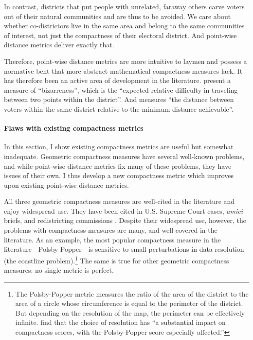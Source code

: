 \documentclass[]{article}
\let\oldparagraph\paragraph
\renewcommand{\paragraph}[1]{\oldparagraph{#1}\mbox{}}
\begin{document}
In contrast, districts that put people with unrelated, faraway others
carve voters out of their natural communities and are thus to be
avoided. We care about whether co-districtors live in the same area and
belong to the same communities of interest, not just the compactness of
their electoral district. And point-wise distance metrics deliver
exactly that.

Therefore, point-wise distance metrics are more intuitive to laymen and
possess a normative bent that more abstract mathematical compactness
measures lack. It has therefore been an active area of development in
the literature. \cite{cm2010} present a measure of ``bizarreness'',
which is the ``expected relative difficulty in traveling between two
points within the district''. And \cite{fh2011} measures ``the distance
between voters within the same district relative to the minimum distance
achievable''.

\hypertarget{flaws-with-existing-compactness-metrics}{%
\paragraph{Flaws with existing compactness
metrics}\label{flaws-with-existing-compactness-metrics}}

In this section, I show existing compactness metrics are useful but
somewhat inadequate. Geometric compactness measures have several
well-known problems, and while point-wise distance metrics fix many of
these problems, they have issues of their own. I thus develop a new
compactness metric which improves upon existing point-wise distance
metrics.

All three geometric compactness measures are well-cited in the
literature and enjoy widespread use. They have been cited in U.S.
Supreme Court cases, \emph{amici} briefs, and redistricting commissions
\citep{moncrief2011}. Despite their widespread use, however, the
problems with compactness measures are many, and well-covered in the
literature. As an example, the most popular compactness measure in the
literature---Polsby-Popper---is sensitive to small perturbations in data
resolution (the coastline problem).\footnote{The Polsby-Popper metric
  measures the ratio of the area of the district to the area of a circle
  whose circumference is equal to the perimeter of the district. But
  depending on the resolution of the map, the perimeter can be
  effectively infinite. \citeauthor{bswp} find that the choice of
  resolution has ``a substantial impact on compactness scores, with the
  Polsby-Popper score especially affected.''} The same is true for other
geometric compactness measures: no single metric is perfect.
\end{document}
